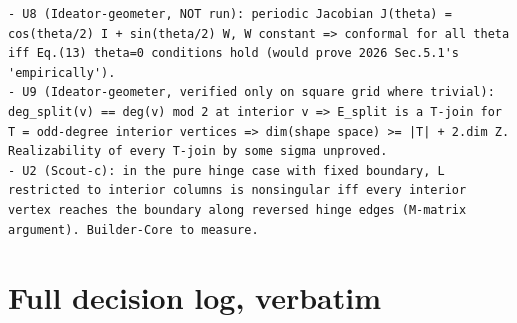\documentclass[10pt,a4paper]{article}
\begin{document}
\begin{lstlisting}
- U8 (Ideator-geometer, NOT run): periodic Jacobian J(theta) = cos(theta/2) I + sin(theta/2) W, W constant => conformal for all theta iff Eq.(13) theta=0 conditions hold (would prove 2026 Sec.5.1's 'empirically').
- U9 (Ideator-geometer, verified only on square grid where trivial): deg_split(v) == deg(v) mod 2 at interior v => E_split is a T-join for T = odd-degree interior vertices => dim(shape space) >= |T| + 2.dim Z. Realizability of every T-join by some sigma unproved.
- U2 (Scout-c): in the pure hinge case with fixed boundary, L restricted to interior columns is nonsingular iff every interior vertex reaches the boundary along reversed hinge edges (M-matrix argument). Builder-Core to measure.
\end{lstlisting}

\section{Full decision log, verbatim}
\end{document}
